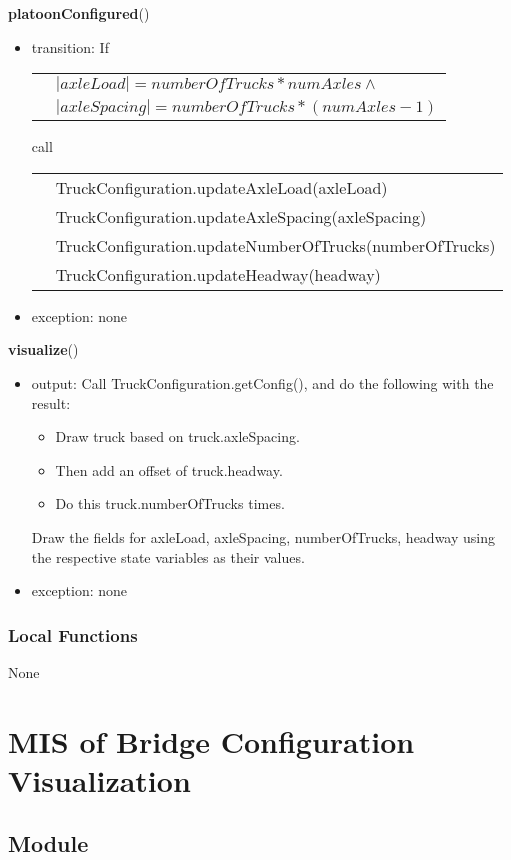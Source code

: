 \documentclass[12pt, titlepage]{article}
\begin{document}
\noindent \textbf{platoonConfigured}()
\begin{itemize}
\item transition: If\\
	\begin{tabular}{p{1cm} p{14cm}}
	& $|axleLoad| = numberOfTrucks * numAxles \land$\\
	& $|axleSpacing| = numberOfTrucks * (numAxles - 1)$
	\end{tabular}
	call\\
	\begin{tabular}{p{1cm} p{14cm}}
	& TruckConfiguration.updateAxleLoad(axleLoad)\\
	& TruckConfiguration.updateAxleSpacing(axleSpacing)\\
	& TruckConfiguration.updateNumberOfTrucks(numberOfTrucks)\\
	& TruckConfiguration.updateHeadway(headway)
	\end{tabular}
\item exception: none
\end{itemize}

\noindent \textbf{visualize}()
\begin{itemize}
\item output: Call TruckConfiguration.getConfig(), and do the following with the result:
\begin{itemize}
\item Draw truck based on truck.axleSpacing.
\item Then add an offset of truck.headway.	
\item Do this truck.numberOfTrucks times.
\end{itemize}
Draw the fields for axleLoad, axleSpacing, numberOfTrucks, headway using the respective state variables as their values.
\item exception: none
\end{itemize}
\subsubsection{Local Functions}
None

\newpage
\section{MIS of Bridge Configuration Visualization} \label{BridgeVisualizer}

\subsection{Module}
\end{document}
